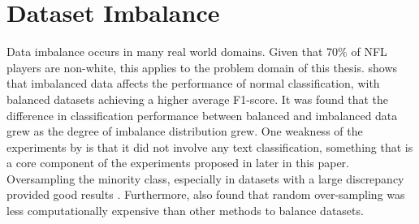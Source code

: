 \documentclass[oneside,12pt]{Classes/RoboticsLaTeX}
\begin{document}
\section{Dataset Imbalance}
Data imbalance occurs in many real world domains. Given that 70\% of NFL players are non-white, this applies to the problem domain of this thesis. \citet{imbalanced_data} shows that imbalanced data affects the performance of normal classification, with balanced 
datasets achieving a higher average F1-score. It was found that the difference in classification performance between balanced and imbalanced data grew as the degree of imbalance distribution grew. One weakness of the experiments by \citet{imbalanced_data} 
is that it did not involve any text classification, something that is a core component of the experiments proposed in later in this paper. Oversampling the minority class, especially in datasets with a large discrepancy provided good results \citep{BalancingMethods}.
Furthermore, \citet{BalancingMethods} also found that random over-sampling was less computationally expensive than other methods to balance datasets. 
\end{document}
